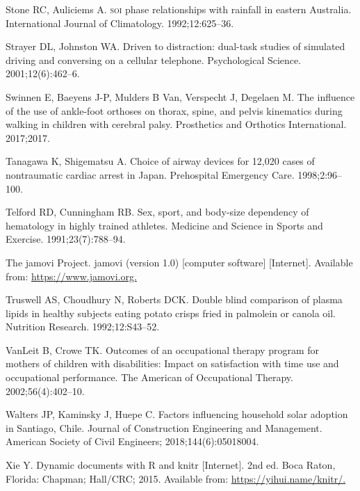 \documentclass[
  11pt,
  a4paper,
  krantz2]{krantz}
\newlength{\cslhangindent}
\newenvironment{CSLReferences}[2] %
 {\begin{list}{}{%
  \setlength{\itemindent}{0pt}
  \setlength{\leftmargin}{0pt}
  \setlength{\parsep}{0pt}
  \ifodd #1
   \setlength{\leftmargin}{\cslhangindent}
   \setlength{\itemindent}{-1\cslhangindent}
  \fi
  \setlength{\itemsep}{#2\baselineskip}}}
 {\end{list}}
\begin{document}
\begin{footnotesize}
\begin{CSLReferences}{1}{0}
Stone RC, Auliciems A. {\textsc{soi}} phase relationships with rainfall in eastern {A}ustralia. International Journal of Climatology. 1992;12:625--36.

Strayer DL, Johnston WA. Driven to distraction: {d}ual-task studies of simulated driving and conversing on a cellular telephone. Psychological Science. 2001;12(6):462--6.

Swinnen E, Baeyens J-P, Mulders B Van, Verspecht J, Degelaen M. The influence of the use of ankle-foot orthoses on thorax, spine, and pelvis kinematics during walking in children with cerebral palsy. Prosthetics and Orthotics International. 2017;2017.

Tanagawa K, Shigematsu A. Choice of airway devices for 12,020 cases of nontraumatic cardiac arrest in {J}apan. Prehospital Emergency Care. 1998;2:96--100.

Telford RD, Cunningham RB. Sex, sport, and body-size dependency of hematology in highly trained athletes. Medicine and Science in Sports and Exercise. 1991;23(7):788--94.

The jamovi Project. {jamovi} (version 1.0) {[}computer software{]} {[}Internet{]}. Available from: \href{https://www.jamovi.org}{https://www.jamovi.org.}

Truswell AS, Choudhury N, Roberts DCK. Double blind comparison of plasma lipids in healthy subjects eating potato crisps fried in palmolein or canola oil. Nutrition Research. 1992;12:S43--52.

VanLeit B, Crowe TK. Outcomes of an occupational therapy program for mothers of children with disabilities: Impact on satisfaction with time use and occupational performance. The {A}merican of Occupational Therapy. 2002;56(4):402--10.

Walters JP, Kaminsky J, Huepe C. Factors influencing household solar adoption in {S}antiago, {C}hile. Journal of Construction Engineering and Management. American Society of Civil Engineers; 2018;144(6):05018004.

Xie Y. Dynamic documents with {R} and knitr {[}Internet{]}. 2nd ed. Boca Raton, Florida: Chapman; Hall/CRC; 2015. Available from: \href{https://yihui.name/knitr/}{https://yihui.name/knitr/.}


\end{CSLReferences}
\end{footnotesize}
\end{document}
